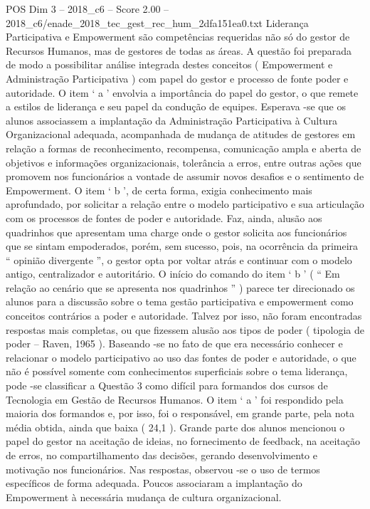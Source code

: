 \begin{textsample}{POS Dim 3 – 2018\_c6 – Score 2.00 – 2018\_c6/enade\_2018\_tec\_gest\_rec\_hum\_2dfa151ea0.txt}
Liderança Participativa e Empowerment são competências requeridas não só do gestor de Recursos Humanos, mas de gestores de todas as áreas.
A questão foi preparada de modo a possibilitar análise integrada destes conceitos ( Empowerment e Administração Participativa ) com papel do gestor e processo de fonte poder e autoridade.
O item ‘ a ’ envolvia a importância do papel do gestor, o que remete a estilos de liderança e seu papel da condução de equipes.
Esperava -se que os alunos associassem a implantação da Administração Participativa à Cultura Organizacional adequada, acompanhada de mudança de atitudes de gestores em relação a formas de reconhecimento, recompensa, comunicação ampla e aberta de objetivos e informações organizacionais, tolerância a erros, entre outras ações que promovem nos funcionários a vontade de assumir novos desafios e o sentimento de Empowerment.
O item ‘ b ’, de certa forma, exigia conhecimento mais aprofundado, por solicitar a relação entre o modelo participativo e sua articulação com os processos de fontes de poder e autoridade.
Faz, ainda, alusão aos quadrinhos que apresentam uma charge onde o gestor solicita aos funcionários que se sintam empoderados, porém, sem sucesso, pois, na ocorrência da primeira “ opinião divergente ”, o gestor opta por voltar atrás e continuar com o modelo antigo, centralizador e autoritário.
O início do comando do item ‘ b ’ ( “ Em relação ao cenário que se apresenta nos quadrinhos ” ) parece ter direcionado os alunos para a discussão sobre o tema gestão participativa e empowerment como conceitos contrários a poder e autoridade.
Talvez por isso, não foram encontradas respostas mais completas, ou que fizessem alusão aos tipos de poder ( tipologia de poder – Raven, 1965 ).
Baseando -se no fato de que era necessário conhecer e relacionar o modelo participativo ao uso das fontes de poder e autoridade, o que não é possível somente com conhecimentos superficiais sobre o tema liderança, pode -se classificar a Questão 3 como difícil para formandos dos cursos de Tecnologia em Gestão de Recursos Humanos.
O item ‘ a ’ foi respondido pela maioria dos formandos e, por isso, foi o responsável, em grande parte, pela nota média obtida, ainda que baixa ( 24,1 ).
Grande parte dos alunos mencionou o papel do gestor na aceitação de ideias, no fornecimento de feedback, na aceitação de erros, no compartilhamento das decisões, gerando desenvolvimento e motivação nos funcionários.
Nas respostas, observou -se o uso de termos específicos de forma adequada.
Poucos associaram a implantação do Empowerment à necessária mudança de cultura organizacional.

\end{textsample}
